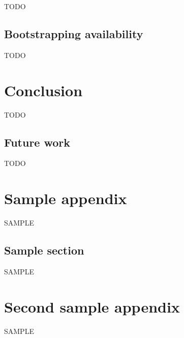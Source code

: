 \documentclass[12pt]{report}
\begin{document}
TODO

\section{Bootstrapping availability}

TODO

\chapter{Conclusion}

TODO

\section{Future work}

TODO

\appendices  %

\chapter{Sample appendix}
SAMPLE
\section{Sample section}
SAMPLE

\chapter{Second sample appendix}
SAMPLE




\end{document}
